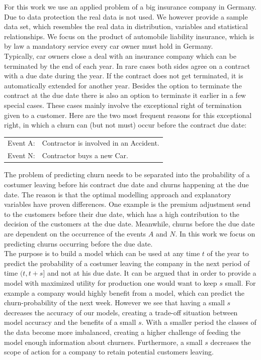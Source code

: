 \documentclass[12pt,titlepage]{article}
\begin{document}
For this work we use an applied problem of a big insurance company in Germany. Due to data protection the real data is not used. We however provide a sample data set, which resembles the real data in distribution, variables and statistical relationships. We focus on the product of automobile liability insurance, which is by law a mandatory service every car owner must hold in Germany. \\
Typically, car owners close a deal with an insurance company which can be terminated by the end of each year. In rare cases both sides agree on a contract with a due date during the year. If the contract does not get terminated, it is automatically extended for another year. Besides the option to terminate the contract at the due date there is also an option to terminate it earlier in a few special cases. These cases mainly involve the exceptional right of termination given to a customer. Here are the two most frequent reasons for this exceptional right, in which a churn can (but not must) occur before the contract due date: \\

\noindent
\begin{center}
    \begin{tabular}{ll}
        Event A: & Contractor is involved in an Accident. \\
        Event N: & Contractor buys a new Car. \\
    \end{tabular}
\end{center}

\vspace{3mm}
\noindent
The problem of predicting churn needs to be separated into the probability of a costumer leaving before his contract due date and churns happening at the due date. The reason is that the optimal modelling approach and explanatory variables have proven differences. One example is the premium adjustment send to the customers before their due date, which has a high contribution to the decision of the customers at the due date. Meanwhile, churns before the due date are dependent on the occurrence of the events $A$ and $N$. In this work we focus on predicting churns occurring before the due date. \\

The purpose is to build a model which can be used at any time $t$ of the year to predict the probability of a costumer leaving the company in the next period of time $(t, t+s]$ and not at his due date. It can be argued that in order to provide a model with maximized utility for production one would want to keep $s$ small. For example a company would highly benefit from a model, which can predict the churn-probability of the next week. However we see that having a small $s$ decreases the accuracy of our models, creating a trade-off situation between model accuracy and the benefits of a small $s$. With a smaller period the classes of the data become more imbalanced, creating a higher challenge of feeding the model enough information about churners. Furthermore, a small $s$ decreases the scope of action for a company to retain potential customers leaving. \\
\end{document}
